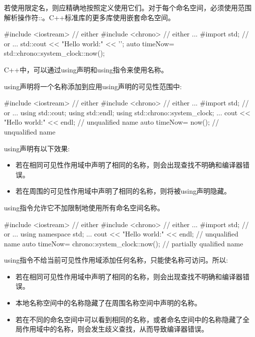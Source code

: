 
若使用限定名，则应精确地按照定义使用它们。对于每个命名空间，必须使用范围解析操作符::。C++标准库的更多库使用嵌套命名空间。

\begin{cpp}
#include <iostream> // either
#include <chrono> // either
...
#import std; // or
...
std::cout << "Hello world:" << '\n';
auto timeNow= std::chrono::system_clock::now();
\end{cpp}


C++中，可以通过using声明和using指令来使用名称。


using声明将一个名称添加到应用using声明的可见性范围中:

\begin{cpp}
#include <iostream> // either
#include <chrono> // either
...
#import std; // or
...
using std::cout;
using std::endl;
using std::chrono::system_clock;
...
cout << "Hello world:" << endl; // unqualified name
auto timeNow= now(); // unqualified name
\end{cpp}

using声明有以下效果:

\begin{itemize}
\item
若在相同可见性作用域中声明了相同的名称，则会出现查找不明确和编译器错误。

\item
若在周围的可见性作用域中声明了相同的名称，则将被using声明隐藏。
\end{itemize}


using指令允许它不加限制地使用所有命名空间名称。

\begin{cpp}
#include <iostream> // either
#include <chrono> // either
...
#import std; // or
...
using namespace std;
...
cout << "Hello world:" << endl; // unqualified name
auto timeNow= chrono::system_clock::now(); // partially qualified name
\end{cpp}

using指令不给当前可见性作用域添加任何名称，只能使名称可访问。所以:

\begin{itemize}
\item
若在相同可见性作用域中声明了相同的名称，则会出现查找不明确和编译器错误。

\item
本地名称空间中的名称隐藏了在周围名称空间中声明的名称。

\item
若在不同的命名空间中可以看到相同的名称，或者命名空间中的名称隐藏了全局作用域中的名称，则会发生歧义查找，从而导致编译器错误。
\end{itemize}

